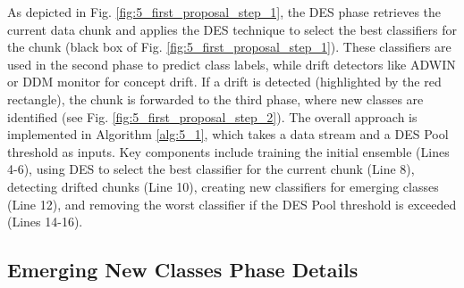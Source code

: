 As depicted in Fig. \ref{fig:5_first_proposal_step_1}, the DES phase retrieves the current data chunk and applies the DES technique to select the best classifiers for the chunk (black box of Fig.  \ref{fig:5_first_proposal_step_1}). These classifiers are used in the second phase to predict class labels, while drift detectors like ADWIN or DDM monitor for concept drift. If a drift is detected (highlighted by the red rectangle), the chunk is forwarded to the third phase, where new classes are identified (see Fig.  \ref{fig:5_first_proposal_step_2}). The overall approach is implemented in Algorithm  \ref{alg:5_1}, which takes a data stream and a DES Pool threshold as inputs. Key components include training the initial ensemble (Lines 4-6), using DES to select the best classifier for the current chunk (Line 8), detecting drifted chunks (Line 10), creating new classifiers for emerging classes (Line 12), and removing the worst classifier if the DES Pool threshold is exceeded (Lines 14-16).


\subsection{Emerging New Classes Phase Details}

